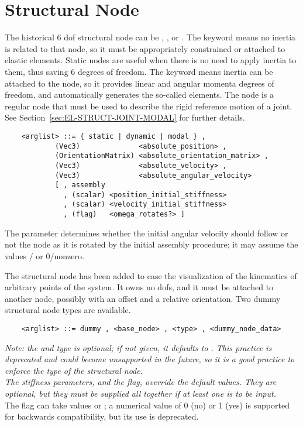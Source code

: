 \section{Structural Node}\label{sec:NODE-STRUCT}
The historical 6 dof structural node can be ,
,  or .
The  keyword means no inertia is related to that node, 
so it must be appropriately constrained or attached to elastic elements.
Static nodes are useful when there is no need to apply inertia
to them, thus saving 6 degrees of freedom.
The  keyword means inertia can be attached to the node, 
so it provides linear and angular momenta degrees of freedom, 
and automatically generates the so-called 
elements.
The  node is a regular  node that must be used 
to describe the rigid reference motion of a  joint.
See Section~\ref{sec:EL-STRUCT-JOINT-MODAL} for further details.
\begin{verbatim}
    <arglist> ::= { static | dynamic | modal } ,
            (Vec3)              <absolute_position> ,
            (OrientationMatrix) <absolute_orientation_matrix> ,
            (Vec3)              <absolute_velocity> ,
            (Vec3)              <absolute_angular_velocity>
            [ , assembly
              , (scalar) <position_initial_stiffness>
              , (scalar) <velocity_initial_stiffness>
              , (flag)   <omega_rotates?> ]
\end{verbatim}
The  parameter determines whether 
the initial angular velocity should follow or not the node 
as it is rotated by the initial assembly procedure; it may assume 
the values / or 0/nonzero.

\noindent
The  structural node has been added to ease the visualization of
the kinematics of arbitrary points of the system. 
It owns no dofs, and it must be attached to another node, possibly with an
offset and a relative orientation.
Two dummy structural node types are available.
\begin{verbatim}
    <arglist> ::= dummy , <base_node> , <type> , <dummy_node_data>
\end{verbatim}
{\em 
    Note: the  and  type is optional; if not given,
    it defaults to . 
    This practice is deprecated and could become unsupported in the future, 
    so it is a good practice to enforce the type of the structural node. \\
    The stiffness parameters, and the  flag, 
    override the default values. 
    They are optional, but they must be supplied all together if at least
    one is to be input.
} \\
The  flag can take values  or ;
a numerical value of 0 (no) or 1 (yes) is supported for backwards
compatibility, but its use is deprecated.

